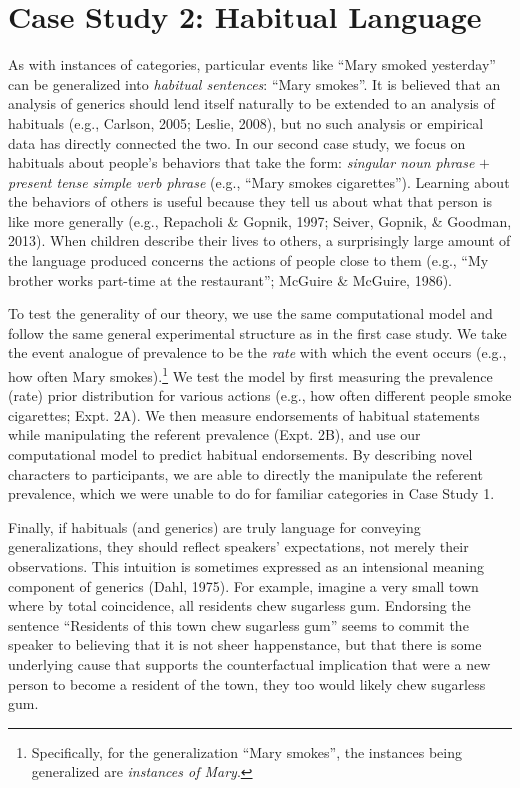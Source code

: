 \documentclass[english,,man,floatsintext]{apa6}
\let\rmarkdownfootnote\footnote%
\def\footnote{\protect\rmarkdownfootnote}
\theoremstyle{definition}
\theoremstyle{definition}
\theoremstyle{definition}
\theoremstyle{remark}
\begin{document}
\hypertarget{case-study-2-habitual-language}{%
\section{Case Study 2: Habitual
Language}\label{case-study-2-habitual-language}}

As with instances of categories, particular events like \enquote{Mary
smoked yesterday} can be generalized into \emph{habitual sentences}:
\enquote{Mary smokes}. It is believed that an analysis of generics
should lend itself naturally to be extended to an analysis of habituals
(e.g., Carlson, 2005; Leslie, 2008), but no such analysis or empirical
data has directly connected the two. In our second case study, we focus
on habituals about people's behaviors that take the form: \emph{singular
noun phrase} \(+\) \emph{present tense simple verb phrase} (e.g.,
\enquote{Mary smokes cigarettes}). Learning about the behaviors of
others is useful because they tell us about what that person is like
more generally (e.g., Repacholi \& Gopnik, 1997; Seiver, Gopnik, \&
Goodman, 2013). When children describe their lives to others, a
surprisingly large amount of the language produced concerns the actions
of people close to them (e.g., ``My brother works part-time at the
restaurant''; McGuire \& McGuire, 1986).

To test the generality of our theory, we use the same computational
model and follow the same general experimental structure as in the first
case study. We take the event analogue of prevalence to be the
\emph{rate} with which the event occurs (e.g., how often Mary
smokes).\footnote{Specifically, for the generalization \enquote{Mary
  smokes}, the instances being generalized are \emph{instances of Mary}.}
We test the model by first measuring the prevalence (rate) prior
distribution for various actions (e.g., how often different people smoke
cigarettes; Expt. 2A). We then measure endorsements of habitual
statements while manipulating the referent prevalence (Expt. 2B), and
use our computational model to predict habitual endorsements. By
describing novel characters to participants, we are able to directly the
manipulate the referent prevalence, which we were unable to do for
familiar categories in Case Study 1.

Finally, if habituals (and generics) are truly language for conveying
generalizations, they should reflect speakers' expectations, not merely
their observations. This intuition is sometimes expressed as an
intensional meaning component of generics (Dahl, 1975). For example,
imagine a very small town where by total coincidence, all residents chew
sugarless gum. Endorsing the sentence \enquote{Residents of this town
chew sugarless gum} seems to commit the speaker to believing that it is
not sheer happenstance, but that there is some underlying cause that
supports the counterfactual implication that were a new person to become
a resident of the town, they too would likely chew sugarless gum.
\end{document}
